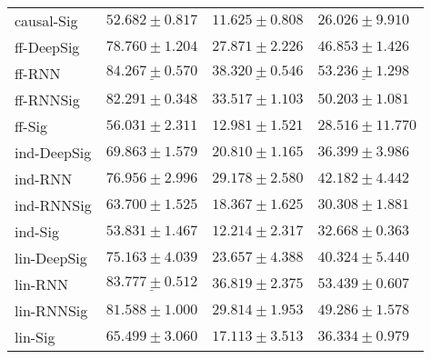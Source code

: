 \begin{tabular}{llll}
causal-Sig     &                           $ 52.682 \pm 0.817 $ &                           $ 11.625 \pm 0.808 $ &                           $ 26.026 \pm 9.910 $ \\
ff-DeepSig     &                           $ 78.760 \pm 1.204 $ &                           $ 27.871 \pm 2.226 $ &                           $ 46.853 \pm 1.426 $ \\
ff-RNN         &  $  \mathbf{ \underline{ 84.267 \pm 0.570 }} $ &  $  \mathbf{ \underline{ 38.320 \pm 0.546 }} $ &            $  \underline{ 53.236 \pm 1.298 } $ \\
ff-RNNSig      &                           $ 82.291 \pm 0.348 $ &                           $ 33.517 \pm 1.103 $ &                           $ 50.203 \pm 1.081 $ \\
ff-Sig         &                           $ 56.031 \pm 2.311 $ &                           $ 12.981 \pm 1.521 $ &                          $ 28.516 \pm 11.770 $ \\
ind-DeepSig    &                           $ 69.863 \pm 1.579 $ &                           $ 20.810 \pm 1.165 $ &                           $ 36.399 \pm 3.986 $ \\
ind-RNN        &                           $ 76.956 \pm 2.996 $ &                           $ 29.178 \pm 2.580 $ &                           $ 42.182 \pm 4.442 $ \\
ind-RNNSig     &                           $ 63.700 \pm 1.525 $ &                           $ 18.367 \pm 1.625 $ &                           $ 30.308 \pm 1.881 $ \\
ind-Sig        &                           $ 53.831 \pm 1.467 $ &                           $ 12.214 \pm 2.317 $ &                           $ 32.668 \pm 0.363 $ \\
lin-DeepSig    &                           $ 75.163 \pm 4.039 $ &                           $ 23.657 \pm 4.388 $ &                           $ 40.324 \pm 5.440 $ \\
lin-RNN        &            $  \underline{ 83.777 \pm 0.512 } $ &                           $ 36.819 \pm 2.375 $ &               $  \mathbf{ 53.439 \pm 0.607 } $ \\
lin-RNNSig     &                           $ 81.588 \pm 1.000 $ &                           $ 29.814 \pm 1.953 $ &                           $ 49.286 \pm 1.578 $ \\
lin-Sig        &                           $ 65.499 \pm 3.060 $ &                           $ 17.113 \pm 3.513 $ &                           $ 36.334 \pm 0.979 $ \\

\end{tabular}
